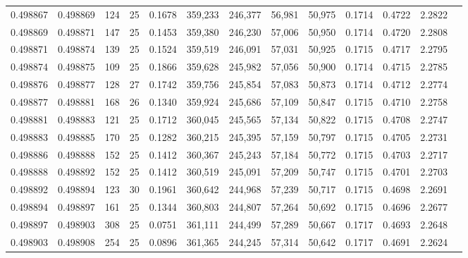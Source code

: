 \begin{tabular}{rrrrrrrrrrrrr}
0.498867 & 0.498869 & 124 &  25 &                                     0.1678 & 359,233 & 246,377 &  56,981 &  50,975 & 0.1714 & 0.4722 & 2.2822 \\
0.498869 & 0.498871 & 147 &  25 &                                     0.1453 & 359,380 & 246,230 &  57,006 &  50,950 & 0.1714 & 0.4720 & 2.2808 \\
0.498871 & 0.498874 & 139 &  25 &                                     0.1524 & 359,519 & 246,091 &  57,031 &  50,925 & 0.1715 & 0.4717 & 2.2795 \\
0.498874 & 0.498875 & 109 &  25 &                                     0.1866 & 359,628 & 245,982 &  57,056 &  50,900 & 0.1714 & 0.4715 & 2.2785 \\
0.498876 & 0.498877 & 128 &  27 &                                     0.1742 & 359,756 & 245,854 &  57,083 &  50,873 & 0.1714 & 0.4712 & 2.2774 \\
0.498877 & 0.498881 & 168 &  26 &                                     0.1340 & 359,924 & 245,686 &  57,109 &  50,847 & 0.1715 & 0.4710 & 2.2758 \\
0.498881 & 0.498883 & 121 &  25 &                                     0.1712 & 360,045 & 245,565 &  57,134 &  50,822 & 0.1715 & 0.4708 & 2.2747 \\
0.498883 & 0.498885 & 170 &  25 &                                     0.1282 & 360,215 & 245,395 &  57,159 &  50,797 & 0.1715 & 0.4705 & 2.2731 \\
0.498886 & 0.498888 & 152 &  25 &                                     0.1412 & 360,367 & 245,243 &  57,184 &  50,772 & 0.1715 & 0.4703 & 2.2717 \\
0.498888 & 0.498892 & 152 &  25 &                                     0.1412 & 360,519 & 245,091 &  57,209 &  50,747 & 0.1715 & 0.4701 & 2.2703 \\
0.498892 & 0.498894 & 123 &  30 &                                     0.1961 & 360,642 & 244,968 &  57,239 &  50,717 & 0.1715 & 0.4698 & 2.2691 \\
0.498894 & 0.498897 & 161 &  25 &                                     0.1344 & 360,803 & 244,807 &  57,264 &  50,692 & 0.1715 & 0.4696 & 2.2677 \\
0.498897 & 0.498903 & 308 &  25 &                                     0.0751 & 361,111 & 244,499 &  57,289 &  50,667 & 0.1717 & 0.4693 & 2.2648 \\
0.498903 & 0.498908 & 254 &  25 &                                     0.0896 & 361,365 & 244,245 &  57,314 &  50,642 & 0.1717 & 0.4691 & 2.2624 \\

\end{tabular}
